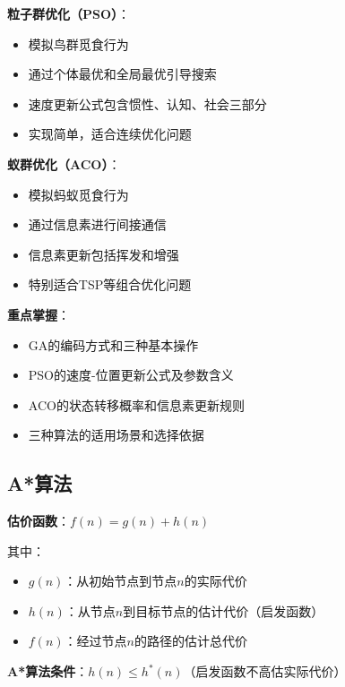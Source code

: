 \textbf{粒子群优化（PSO）}：
\begin{itemize}[leftmargin=2em,itemsep=0pt]
    \item 模拟鸟群觅食行为
    \item 通过个体最优和全局最优引导搜索
    \item 速度更新公式包含惯性、认知、社会三部分
    \item 实现简单，适合连续优化问题
\end{itemize}

\textbf{蚁群优化（ACO）}：
\begin{itemize}[leftmargin=2em,itemsep=0pt]
    \item 模拟蚂蚁觅食行为
    \item 通过信息素进行间接通信
    \item 信息素更新包括挥发和增强
    \item 特别适合TSP等组合优化问题
\end{itemize}

\textbf{重点掌握}：
\begin{itemize}[leftmargin=2em,itemsep=0pt]
    \item GA的编码方式和三种基本操作
    \item PSO的速度-位置更新公式及参数含义
    \item ACO的状态转移概率和信息素更新规则
    \item 三种算法的适用场景和选择依据
\end{itemize}




\subsection{A*算法}

\begin{formulabox}
\textbf{估价函数}：$f(n) = g(n) + h(n)$

其中：
\begin{itemize}[itemsep=0pt]
    \item $g(n)$：从初始节点到节点$n$的实际代价
    \item $h(n)$：从节点$n$到目标节点的估计代价（启发函数）
    \item $f(n)$：经过节点$n$的路径的估计总代价
\end{itemize}

\textbf{A*算法条件}：$h(n) \leq h^*(n)$（启发函数不高估实际代价）
\end{formulabox}

